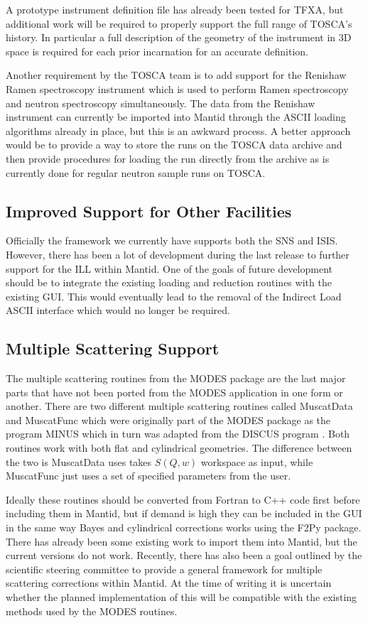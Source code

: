 \documentclass[paper=a4, fontsize=11pt]{scrartcl}	%
\numberwithin{equation}{section}															%
\numberwithin{figure}{section}																%
\numberwithin{table}{section}																%
\begin{document}
A prototype instrument definition file has already been tested for TFXA, but additional work will be required to properly support the full range of TOSCA's history. In particular a full description of the geometry of the instrument in 3D space is required for each prior incarnation for an accurate definition.

Another requirement by the TOSCA team is to add support for the Renishaw Ramen spectroscopy instrument which is used to perform Ramen spectroscopy and neutron spectroscopy simultaneously. The data from the Renishaw instrument can currently be imported into Mantid through the ASCII loading algorithms already in place, but this is an awkward process. A better approach would be to provide a way to store the runs on the TOSCA data archive and then provide procedures for loading the run directly from the archive as is currently done for regular neutron sample runs on TOSCA.

\subsection{Improved Support for Other Facilities}
Officially the framework we currently have supports both the SNS and ISIS. However, there has been a lot of development during the last release to further support for the ILL within Mantid. One of the goals of future development should be to integrate the existing loading and reduction routines with the existing GUI. This would eventually lead to the removal of the Indirect Load ASCII interface which would no longer be required.

\subsection{Multiple Scattering Support}
\label{subsec:multiple-scattering}
The multiple scattering routines from the MODES package are the last major parts that have not been ported from the MODES application in one form or another. There are two different multiple scattering routines called MuscatData and MuscatFunc which were originally part of the MODES package as the program MINUS which in turn was adapted from the DISCUS program \citep{wshowells2010, mjohnson1974}. Both routines work with both flat and cylindrical geometries. The difference between the two is MuscatData uses takes $S(Q,w)$ workspace as input, while MuscatFunc just uses a set of specified parameters from the user. 

Ideally these routines should be converted from Fortran to C++ code first before including them in Mantid, but if demand is high they can be included in the GUI in the same way Bayes and cylindrical corrections works using the F2Py package. There has already been some existing work to import them into Mantid, but the current versions do not work. Recently, there has also been a goal outlined by the scientific steering committee to provide a general framework for multiple scattering corrections within Mantid. At the time of writing it is uncertain whether the planned implementation of this will be compatible with the existing methods used by the MODES routines.
\end{document}
